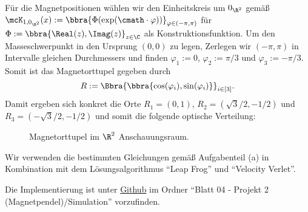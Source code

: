 \documentclass[
    oneside,
    ngerman,
    footinclude=false,
    captions=tableheading,
    DIV=12
]{scrartcl}
\begin{document}
\subaufgabe{}
    Für die Magnetpositionen wählen wir den Einheitskreis um $0_{\R^2}$ gemäß $\mcK_{1,0_{\R^2}}(x):=\bbra{\Phi({\exp}(\cmath\cdot\varphi))}_{\varphi\in(-\pi,\pi)}$ für $\Phi:=\bbra{\Real(z),\Imag(z)}_{z\in\C}$ als Konstruktionsfunktion. Um den Masseschwerpunkt in den Ursprung $(0,0)$ zu legen, Zerlegen wir $(-\pi,\pi)$ in Intervalle gleichen Durchmessers und finden $\varphi_1:=0$, $\varphi_2:=\pi/3$ und $\varphi_3:=-\pi/3$. Somit ist das Magnetorttupel gegeben durch
    \[
        R:=\Bbra{\bbra{\cos(\varphi_i),\sin(\varphi_i)}}_{i\in[3]}.
    \]
    Damit ergeben sich konkret die Orte $R_1 = (0,1)$, $R_2 = (\sqrt{3}/2,-1/2)$ und $R_3 = (-\sqrt{3}/2,-1/2)$ und somit die folgende optische Verteilung:
    \begin{figure}[H]
        \centering
        \caption{Magnetorttupel im $\R^2$ Anschauungsraum.}
    \end{figure}


\subaufgabe{}
    Wir verwenden die bestimmten Gleichungen gemäß Aufgabenteil (a) in Kombination mit dem Lösungsalgorithmus \enquote{Leap Frog} und \enquote{Velocity Verlet}. 

\subaufgabe{}
    Die Implementierung ist unter \href{https://github.com/unb3rechenbar/ComputerPhysik-I-Projekte.git}{Github} im Ordner \enquote{Blatt 04 - Projekt 2 (Magnetpendel)/Simulation} vorzufinden. 

\subaufgabe{}

\subaufgabe{}
\end{document}
